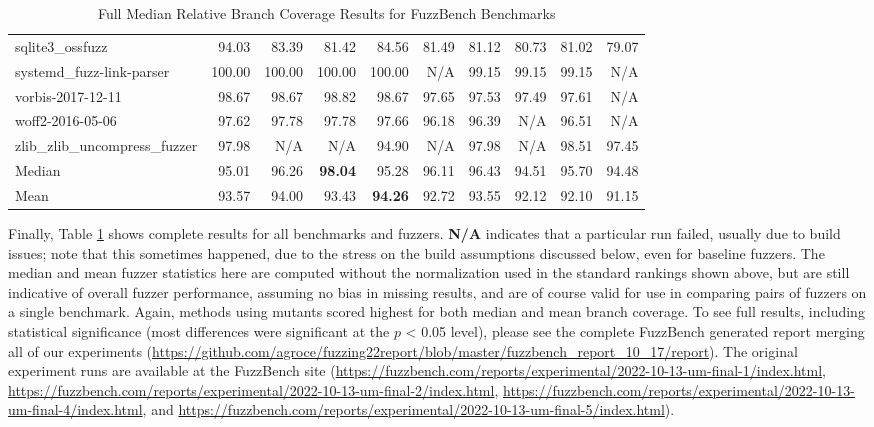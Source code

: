 \begin{table}
{\begin{tabular}{l||r|r|r|r||r|r|r|r|r}
sqlite3\_ossfuzz & 94.03 & 83.39 & 81.42 & 84.56 & 81.49 & 81.12 & 80.73 & 81.02 & 79.07 \\
systemd\_fuzz-link-parser & 100.00 & 100.00 & 100.00 & 100.00 & N/A & 99.15 & 99.15 & 99.15 & N/A \\
vorbis-2017-12-11 & 98.67 & 98.67 & 98.82 & 98.67 & 97.65 & 97.53 & 97.49 & 97.61 & N/A \\
woff2-2016-05-06 & 97.62 & 97.78 & 97.78 & 97.66 & 96.18 & 96.39 & N/A & 96.51 & N/A \\
zlib\_zlib\_uncompress\_fuzzer & 97.98 & N/A & N/A & 94.90 & N/A & 97.98 & N/A & 98.51 & 97.45 \\
\hline
Median & 95.01 & 96.26 & {\bf 98.04} & 95.28 & 96.11 & 96.43 & 94.51 & 95.70 & 94.48 \\
Mean & 93.57 & 94.00 & 93.43 & {\bf 94.26} & 92.72 & 93.55 & 92.12 & 92.10 & 91.15 \\
      \end{tabular}
      }
      \caption{Full Median Relative Branch Coverage Results for FuzzBench Benchmarks}
      \label{tab:fullfuzzbench}
    \end{table}

    Finally, Table \ref{tab:fullfuzzbench} shows complete results for all benchmarks and fuzzers.  {\bf N/A} indicates that a particular run failed, usually due to build issues; note that this sometimes happened, due to the stress on the build assumptions discussed below, even for baseline fuzzers.  The median and mean fuzzer statistics here are computed without the normalization used in the standard rankings shown above, but are still indicative of overall fuzzer performance, assuming no bias in missing results, and are of course valid for use in comparing pairs of fuzzers on a single benchmark.  Again, methods using mutants scored highest for both median and mean branch coverage.  To see full results, including statistical significance (most differences were significant at the $p$ < 0.05 level), please see the complete FuzzBench generated report merging all of our experiments (\url{https://github.com/agroce/fuzzing22report/blob/master/fuzzbench_report_10_17/report}).  The original experiment runs are available at the FuzzBench site (\url{https://fuzzbench.com/reports/experimental/2022-10-13-um-final-1/index.html}, \url{https://fuzzbench.com/reports/experimental/2022-10-13-um-final-2/index.html}, \url{https://fuzzbench.com/reports/experimental/2022-10-13-um-final-4/index.html}, and \url{https://fuzzbench.com/reports/experimental/2022-10-13-um-final-5/index.html}).

